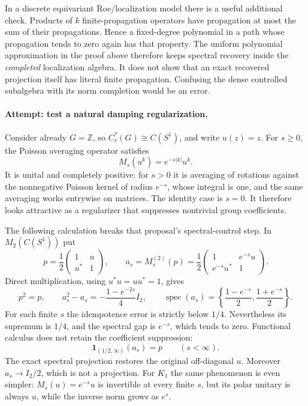 \documentclass[11pt]{article}
\newcommand{\Z}{\mathbb{Z}}
\begin{document}
In a discrete equivariant Roe/localization model there is a useful
additional check. Products of $k$ finite-propagation operators have
propagation at most the sum of their propagations. Hence a fixed-degree
polynomial in a path whose propagation tends to zero again has that
property. The uniform polynomial approximation in the proof above
therefore keeps spectral recovery inside the \emph{completed}
localization algebra. It does not show that an exact recovered projection
itself has literal finite propagation. Confusing the dense controlled
subalgebra with its norm completion would be an error.

\paragraph{Attempt: test a natural damping regularization.}
Consider already $G=\Z$, so $C_r^*(G)\cong C(S^1)$, and write $u(z)=z$.
For $s\ge0$, the Poisson averaging operator satisfies
\[
 M_s(u^k)=e^{-s|k|}u^k.
\]
It is unital and completely positive: for $s>0$ it is averaging of
rotations against the nonnegative Poisson kernel of radius $e^{-s}$,
whose integral is one, and the same averaging works entrywise on
matrices. The identity case is $s=0$. It therefore looks attractive as a
regularizer that suppresses nontrivial group coefficients.

The following calculation breaks that proposal's spectral-control step.
In $M_2(C(S^1))$ put
\[
 p=\frac12\begin{pmatrix}1&u\\u^*&1\end{pmatrix},\qquad
 a_s=M_s^{(2)}(p)=\frac12
 \begin{pmatrix}1&e^{-s}u\\e^{-s}u^*&1\end{pmatrix}.
\]
Direct multiplication, using $u^*u=uu^*=1$, gives
\begin{equation}\label{ra:1479:damping}
 p^2=p,\qquad
 a_s^2-a_s=-\frac{1-e^{-2s}}4 I_2,
 \qquad
 \operatorname{spec}(a_s)=
 \left\{\frac{1-e^{-s}}2,\frac{1+e^{-s}}2\right\}.
\end{equation}
For each finite $s$ the idempotence error is strictly below $1/4$.
Nevertheless its supremum is $1/4$, and the spectral gap is $e^{-s}$,
which tends to zero. Functional calculus does not retain the coefficient
suppression:
\begin{equation}\label{ra:1479:undamping}
 \mathbf1_{(1/2,\infty)}(a_s)=p\qquad(s<\infty).
\end{equation}
The exact spectral projection restores the original off-diagonal $u$.
Moreover $a_s\to I_2/2$, which is not a projection. For $K_1$ the same
phenomenon is even simpler: $M_s(u)=e^{-s}u$ is invertible at every finite
$s$, but its polar unitary is always $u$, while the inverse norm grows
as $e^s$.
\end{document}
